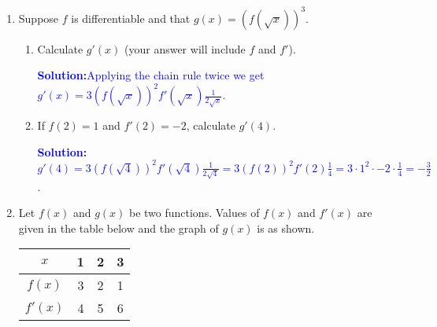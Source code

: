 \documentclass[letterpaper,11pt]{article}
\newcommand{\sol}[2]{\begin{minipage}[c][#1]{\linewidth}{\textcolor{blue}{\textbf{Solution:}}\quad \textcolor{blue}{#2}}\end{minipage}}
\newcommand{\sol}[2]{\begin{minipage}[c][#1]{\linewidth}{\vfill}\end{minipage}}
\begin{document}
\begin{enumerate}
\begin{enumerate}
\sol{1.5in}{$f(x)=\sin{2x}=2\sin(x)\cos(x)$, by the sine double angle-formula. Let $u=2\sin(x)$ and $v=\cos(x)$, then $f'(x)=2\cos(x)\cos(x)-2\sin(x)\sin(x)=2(\cos^2(x)-\sin^2(x)$)}

\item Apply the chain rule directly to the expression $f(x)=\sin(2x)$ to find its derivative a second way.

\sol{1.2in}{$f'(x)=\cos(2x) \cdot 2=2\cos(2x)$}

\item Are your answers in parts a and b the same? Why or why not?

\sol{1.2 in}{
Part (a) gives = $f'(x)=2(\cos^2(x)-\sin^2(x))$, by the cosine double-angle formula, $f'(x)=2\cos(2x)$. The two answers are the same because it doesn't matter which method you use to take a derivative. If done correctly, they should all give the same answer.}

\end{enumerate}


\item Suppose $f$ is differentiable and that $g(x) = (f(\sqrt{x}))^3$. 
\begin{enumerate}
\item Calculate $g'(x)$ (your answer will include $f$ and $f'$).

\sol{.5in}{Applying the chain rule twice we get $g'(x)=3(f(\sqrt{x}))^2f'(\sqrt{x})\frac{1}{2\sqrt{x}}$.} 

\item If $f(2)=1$ and $f'(2)=-2$, calculate $g'(4)$.

\sol{.8in}{
$g'(4)=3(f(\sqrt{4}))^2f'(\sqrt{4})\frac{1}{2\sqrt{4}} = 3(f(2))^2f'(2)\frac{1}{4}=3\cdot1^2\cdot-2\cdot\frac{1}{4}=-\frac{3}{2}$.}
\end{enumerate}
\newpage


\item Let $f(x)$ and $g(x)$ be two functions. Values of $f(x)$ and $f'(x)$ are given in the table below and the graph of $g(x)$ is as shown.

\begin{multicols}{3}

\begin{tabular}{c|c c c}
$x$ & 1 & 2 & 3 \\ \hline
$f(x)$ & 3 & 2 & 1 \\ \hline
$f'(x)$ & 4 & 5 & 6 \\
\end{tabular}

\begin{center}
\end{center}


\end{multicols}
\end{enumerate}
\end{document}
